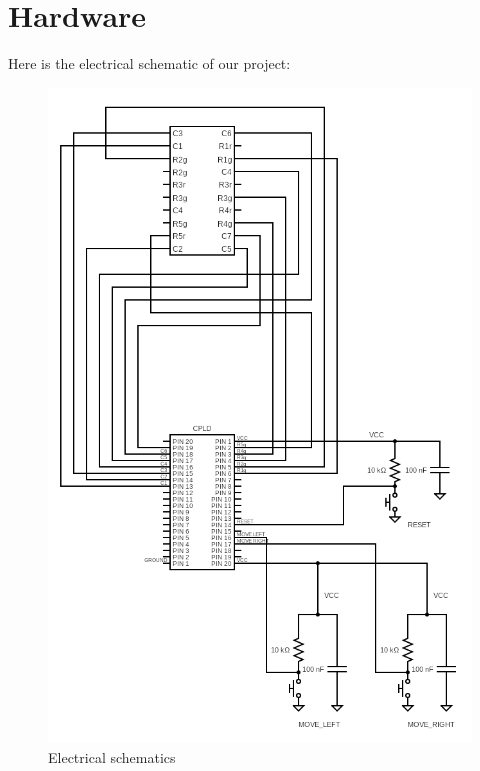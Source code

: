 \section{Hardware}

Here is the electrical schematic of our project:


\begin{figure}[H]
    \centering
    \includegraphics[scale = 0.4]{Ressources/png/circuit.png}
    \caption{Electrical schematics}
    \label{fig:my_label}
\end{figure}

